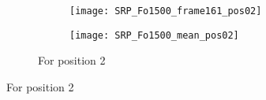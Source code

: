 \begin{figure}
\begin{subfigure}[t]{0.47\textwidth}
\begin{minipage}[t]{\textwidth}
\begin{subfigure}[t]{0.3\textwidth}
        \texttt{[image: SRP\_Fo1500\_frame161\_pos02]}
        \label{fig:SRP_pos02}
      \end{subfigure}
      \begin{subfigure}[t]{0.3\textwidth}
        \texttt{[image: SRP\_Fo1500\_mean\_pos02]}
        \label{fig:SRP_Fo1500_mean_pos02}
      \end{subfigure}
      \vspace{\verticalSpacingSRPMaps}
      \caption{\centering For position 2}
      \vspace{0.25cm}
    \end{minipage}
  \end{subfigure}


\end{figure}

